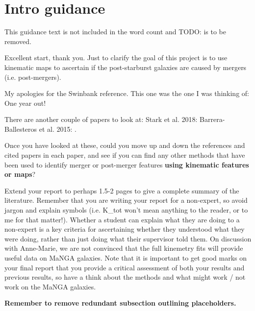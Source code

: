 \section*{Intro guidance}

This guidance text is not included in the word count and TODO: is to be removed.


Excellent start, thank you. Just to clarify the goal of this project is to use kinematic maps to ascertain if the post-starburst galaxies are caused by mergers (i.e. post-mergers). 

My apologies for the Swinbank reference. This one was the one I was thinking of: \citet{2012MNRAS.420..672S} One year out!
 
There are another couple of papers to look at:
Stark et al. 2018: \citep{2018MNRAS.480.2217S} 
Barrera-Ballesteros et al. 2015: \citep{2015A&A...582A..21B}.
 
Once you have looked at these, could you move up and down the references and cited papers in each paper, and see if you can find any other methods that have been used to identify merger or post-merger features \textbf{using kinematic features or maps}?
 
Extend your report to perhaps 1.5-2 pages to give a complete summary of the literature.
Remember that you are writing your report for a non-expert, so avoid jargon and explain symbols (i.e. K\_tot won't mean anything to the reader, or to me for that matter!). Whether a student can explain what they are doing to a non-expert is a key criteria for ascertaining whether they understood what they were doing, rather than just doing what their supervisor told them.  On discussion with Anne-Marie, we are not convinced that the full kinemetry fits will provide useful data on MaNGA galaxies. Note that it is important to get good marks on your final report that you provide a critical assessment of both your results and previous results, so have a think about the methods and what might work / not work on the MaNGA galaxies. 

\vspace{6pt}
\textbf{Remember to remove redundant subsection outlining placeholders.}
